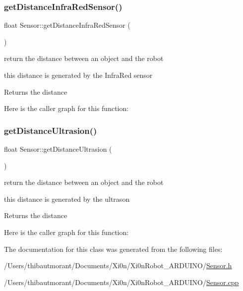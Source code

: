 \subsubsection{\texorpdfstring{get\+Distance\+Infra\+Red\+Sensor()}{getDistanceInfraRedSensor()}}
{\footnotesize\ttfamily float Sensor\+::get\+Distance\+Infra\+Red\+Sensor (\begin{DoxyParamCaption}{ }\end{DoxyParamCaption})}



return the distance between an object and the robot 

this distance is generated by the Infra\+Red sensor

\begin{DoxyReturn}{Returns}
the distance 
\end{DoxyReturn}
Here is the caller graph for this function\+:
\mbox{\label{class_sensor_ac52b531672dcadef0bc4993590d0c5d0}} 
\subsubsection{\texorpdfstring{get\+Distance\+Ultrasion()}{getDistanceUltrasion()}}
{\footnotesize\ttfamily float Sensor\+::get\+Distance\+Ultrasion (\begin{DoxyParamCaption}{ }\end{DoxyParamCaption})}



return the distance between an object and the robot 

this distance is generated by the ultrason

\begin{DoxyReturn}{Returns}
the distance 
\end{DoxyReturn}
Here is the caller graph for this function\+:


The documentation for this class was generated from the following files\+:\begin{DoxyCompactItemize}
\item 
/\+Users/thibautmorant/\+Documents/\+Xi0n/\+Xi0n\+Robot\+\_\+\+A\+R\+D\+U\+I\+N\+O/\hyperlink{_sensor_8h}{Sensor.\+h}\item 
/\+Users/thibautmorant/\+Documents/\+Xi0n/\+Xi0n\+Robot\+\_\+\+A\+R\+D\+U\+I\+N\+O/\hyperlink{_sensor_8cpp}{Sensor.\+cpp}\end{DoxyCompactItemize}
